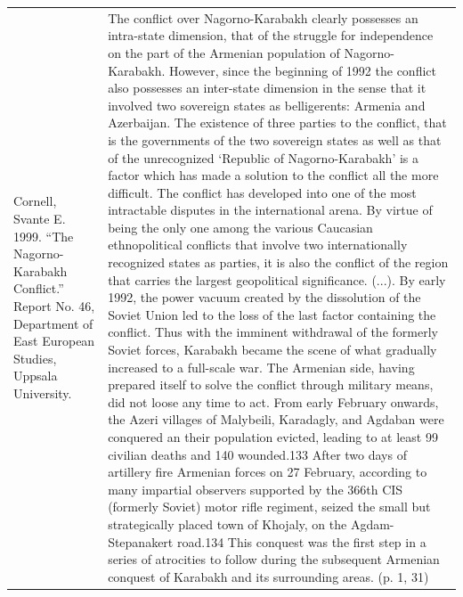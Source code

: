 {\begin{longtable}{p{}p{}}
\\
Cornell, Svante E. 1999. “The Nagorno-Karabakh Conflict.” Report No. 46, Department of East European Studies, Uppsala University. & The conflict over Nagorno-Karabakh clearly possesses an intra-state dimension, that of the struggle for independence on the part of the Armenian population of Nagorno-Karabakh. However, since the beginning of 1992 the conflict also possesses an inter-state dimension in the sense that it involved two sovereign states as belligerents: Armenia and Azerbaijan. The existence of three parties to the conflict, that is the governments of the two sovereign states as well as that of the unrecognized ‘Republic of Nagorno-Karabakh' is a factor which has made a solution to the conflict all the more difficult. The conflict has developed into one of the most intractable disputes in the international arena. By virtue of being the only one among the various Caucasian ethnopolitical conflicts that involve two internationally recognized states as parties, it is also the conflict of the region that carries the largest geopolitical significance. (...). By early 1992, the power vacuum created by the dissolution of the Soviet Union led to the loss of the last factor containing the conflict. Thus with the imminent withdrawal of the formerly Soviet forces, Karabakh became the scene of what gradually increased to a full-scale war. The Armenian side, having prepared itself to solve the conflict through military means, did not loose any time to act. From early February onwards, the Azeri villages of Malybeili, Karadagly, and Agdaban were conquered an their population evicted, leading to at least 99 civilian deaths and 140 wounded.133 After two days of artillery fire Armenian forces on 27 February, according to many impartial observers supported by the 366th CIS (formerly Soviet) motor rifle regiment, seized the small but strategically placed town of Khojaly, on the Agdam-Stepanakert road.134 This conquest was the first step in a series of atrocities to follow during the subsequent Armenian conquest of Karabakh and its surrounding areas. (p. 1, 31)
\\

\end{longtable}}

